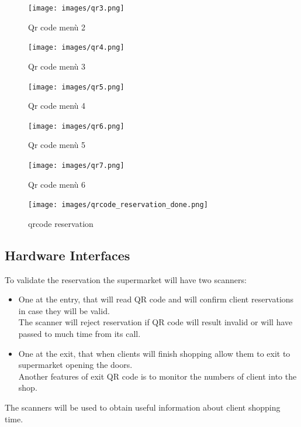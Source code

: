 \begin{figure}
	\begin{minipage}{0.48\textwidth}
		\centering
		\texttt{[image: images/qr3.png]}
		\caption{Qr code menù 2}
	\end{minipage}
	\hfill
	\begin{minipage}{0.48\textwidth}
		\centering
		\texttt{[image: images/qr4.png]}
		\caption{Qr code menù 3}
	\end{minipage}
\end{figure}

\begin{figure}
	\begin{minipage}{0.48\textwidth}
		\centering
		\texttt{[image: images/qr5.png]}
		\caption{Qr code menù 4}
	\end{minipage}
	\hfill
	\begin{minipage}{0.48\textwidth}
		\centering
		\texttt{[image: images/qr6.png]}
		\caption{Qr code menù 5}
	\end{minipage}
\end{figure}

\begin{figure}
	\begin{minipage}{0.48\textwidth}
		\centering
		\texttt{[image: images/qr7.png]}
		\caption{Qr code menù 6}
	\end{minipage}
	\hfill
	\begin{minipage}{0.48\textwidth}
		\centering
		\texttt{[image: images/qrcode\_reservation\_done.png]}
		\caption{qrcode reservation}
	\end{minipage}
\end{figure}


\subsection{Hardware Interfaces}


To validate the reservation the supermarket will have two scanners:

\par \medskip 
\begin{itemize}
\item	One at the entry, that will read QR code and will confirm client reservations in case they will be valid. \\
The scanner will reject reservation if QR code will result invalid or will have passed to much time from its call.
\item One at the exit, that when clients will finish shopping allow them to exit to supermarket opening the doors. \\
Another features of exit QR code is to monitor the numbers of client into the shop.
\end{itemize} 
\par \medskip 
The scanners will be used to obtain useful information about client shopping time.

